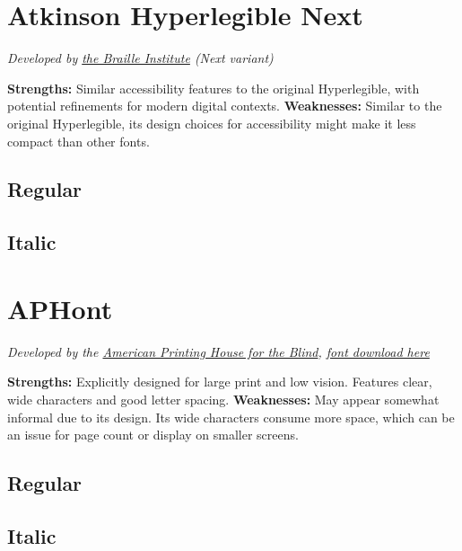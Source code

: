 \pagebreak
\section{Atkinson Hyperlegible Next}\label{troubleAtkinsonNext}
\emph{Developed by \href{https://brailleinstitute.org/freefont}{the Braille Institute} (Next variant)}
\begin{raggedright}
\textbf{Strengths:} Similar accessibility features to the original Hyperlegible, with potential refinements for modern digital contexts.
\textbf{Weaknesses:} Similar to the original Hyperlegible, its design choices for accessibility might make it less compact than other fonts.

\subsection{Regular}
\FontSample{\atkinsonnextfont}

\subsection{Italic}
\FontSample{{\atkinsonnextfont\itshape}}
\end{raggedright}


\pagebreak
\section{APHont}\label{trouble7}
\emph{Developed by the \href{https://www.aph.org/resources/large-print-guidelines/}{American Printing House for the Blind}, \href{https://www.aph.org/resources/large-print-guidelines/}{font download here}}
\begin{raggedright}
\textbf{Strengths:} Explicitly designed for large print and low vision. Features clear, wide characters and good letter spacing.
\textbf{Weaknesses:} May appear somewhat informal due to its design. Its wide characters consume more space, which can be an issue for page count or display on smaller screens.

\subsection{Regular}
\FontSample{\aphontfont}

\subsection{Italic}
\FontSample{{\aphontfont\itshape}}
\end{raggedright}


